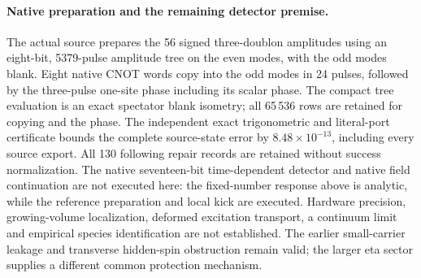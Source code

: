 \paragraph{Native preparation and the remaining detector premise.}
The actual source prepares the 56 signed three-doublon amplitudes
using an eight-bit, 5379-pulse amplitude tree on the even modes, with
the odd modes blank. Eight native CNOT words copy into the odd modes
in 24 pulses, followed by the three-pulse one-site phase including
its scalar phase. The compact tree evaluation is an exact spectator
blank isometry; all 65\,536 rows are retained for copying and the
phase. The independent exact trigonometric and literal-port
certificate bounds the complete source-state error by
$8.48\times10^{-13}$, including every source export. All 130 following
repair records are retained without success normalization.
The native seventeen-bit time-dependent detector and native field
continuation are not executed here: the fixed-number response above
is analytic, while the reference preparation and local kick are
executed. Hardware precision, growing-volume localization, deformed
excitation transport, a continuum limit and empirical species
identification are not established. The earlier small-carrier leakage and
transverse hidden-spin obstruction remain valid; the larger eta
sector supplies a different common protection mechanism.
